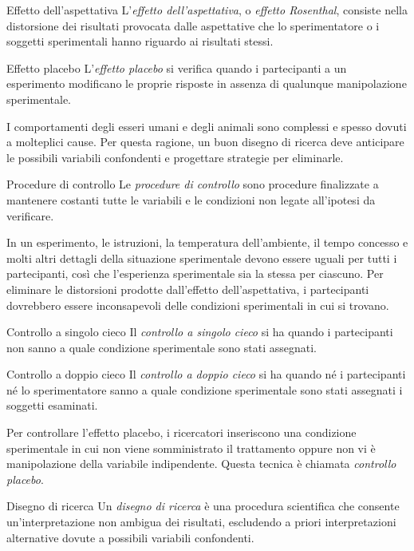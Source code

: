 \documentclass[a4paper]{article}
\begin{document}
\begin{snippetdefinition}{Effetto dell'aspettativa}
    L'\emph{effetto dell'aspettativa}, o \emph{effetto Rosenthal}, consiste nella distorsione dei risultati provocata dalle aspettative che lo sperimentatore o i soggetti sperimentali hanno riguardo ai risultati stessi.
\end{snippetdefinition}
\begin{snippetdefinition}{Effetto placebo}
    L'\emph{effetto placebo} si verifica quando i partecipanti a un esperimento modificano le proprie risposte in assenza di qualunque manipolazione sperimentale.
\end{snippetdefinition}
I comportamenti degli esseri umani e degli animali sono complessi e spesso dovuti a molteplici cause. Per questa ragione, un buon disegno di ricerca deve anticipare le possibili variabili confondenti e progettare strategie per eliminarle.
\begin{snippetdefinition}{Procedure di controllo}
    Le \emph{procedure di controllo} sono procedure finalizzate a mantenere costanti tutte le variabili e le condizioni non legate all'ipotesi da verificare.
\end{snippetdefinition}
In un esperimento, le istruzioni, la temperatura dell'ambiente, il tempo concesso e molti altri dettagli della situazione sperimentale devono essere uguali per tutti i partecipanti, così che l'esperienza sperimentale sia la stessa per ciascuno.
Per eliminare le distorsioni prodotte dall'effetto dell'aspettativa, i partecipanti dovrebbero essere inconsapevoli delle condizioni sperimentali in cui si trovano.
\begin{snippetdefinition}{Controllo a singolo cieco}
    Il \emph{controllo a singolo cieco} si ha quando i partecipanti non sanno a quale condizione sperimentale sono stati assegnati.
\end{snippetdefinition}
\begin{snippetdefinition}{Controllo a doppio cieco}
    Il \emph{controllo a doppio cieco} si ha quando né i partecipanti né lo sperimentatore sanno a quale condizione sperimentale sono stati assegnati i soggetti esaminati.
\end{snippetdefinition}
Per controllare l'effetto placebo, i ricercatori inseriscono una condizione sperimentale in cui non viene somministrato il trattamento oppure non vi è manipolazione della variabile indipendente. Questa tecnica è chiamata \emph{controllo placebo}.
\begin{snippetdefinition}{Disegno di ricerca}
    Un \emph{disegno di ricerca} è una procedura scientifica che consente un'interpretazione non ambigua dei risultati, escludendo a priori interpretazioni alternative dovute a possibili variabili confondenti.
\end{snippetdefinition}
\end{document}
